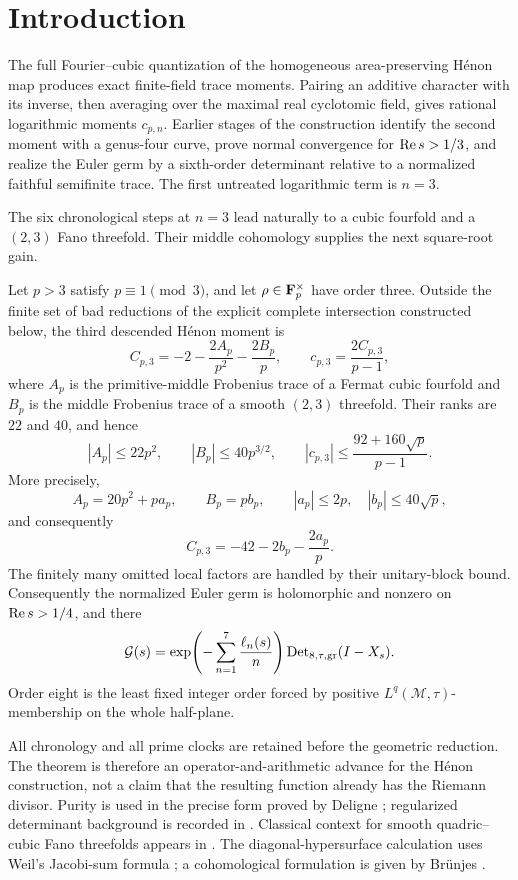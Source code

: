 \section{Introduction}

The full Fourier--cubic quantization of the homogeneous area-preserving
H\'enon map produces exact finite-field trace moments.  Pairing an additive
character with its inverse, then averaging over the maximal real cyclotomic
field, gives rational logarithmic moments \(c_{p,n}\).  Earlier stages of the
construction identify the second moment with a genus-four curve, prove
normal convergence for \(\operatorname{Re} s>1/3\), and realize the Euler germ by a
sixth-order determinant relative to a normalized faithful semifinite trace.
The first untreated logarithmic term is \(n=3\).

The six chronological steps at \(n=3\) lead naturally to a cubic fourfold
and a \((2,3)\) Fano threefold.  Their middle cohomology supplies the next
square-root gain.

\begin{theorem}\label{thm:main}
Let \(p>3\) satisfy \(p\equiv1\pmod3\), and let \(\rho\in\mathbf F_p^\times\) have
order three.  Outside the finite set of bad reductions of the explicit
complete intersection constructed below, the third descended H\'enon moment
is
\[
 C_{p,3}=-2-\frac{2A_p}{p^2}-\frac{2B_p}{p},
 \qquad
 c_{p,3}=\frac{2C_{p,3}}{p-1},
\]
where \(A_p\) is the primitive-middle Frobenius trace of a Fermat cubic
fourfold and \(B_p\) is the middle Frobenius trace of a smooth \((2,3)\)
threefold.  Their ranks are \(22\) and \(40\), and hence
\[
 |A_p|\le22p^2,
 \qquad |B_p|\le40p^{3/2},
 \qquad
 |c_{p,3}|\le\frac{92+160\sqrt p}{p-1}.
\]
More precisely,
\[
 A_p=20p^2+pa_p,\qquad B_p=pb_p,
 \qquad |a_p|\le2p,\quad |b_p|\le40\sqrt p,
\]
and consequently
\[
 C_{p,3}=-42-2b_p-\frac{2a_p}{p}.
\]
The finitely many omitted local factors are handled by their unitary-block
bound.  Consequently the normalized Euler germ is holomorphic and nonzero
on \(\operatorname{Re} s>1/4\), and there
\[
 \mathcal G(s)=
 \exp\!\left(-\sum_{n=1}^{7}\frac{\ell_n(s)}n\right)
 \operatorname{Det}_{8,\tau,\mathrm{gr}}(I-X_s).
\]
Order eight is the least fixed integer order forced by positive
\(L^q(\mathcal M,\tau)\)-membership on the whole half-plane.
\end{theorem}

All chronology and all prime clocks are retained before the geometric
reduction.  The theorem is therefore an operator-and-arithmetic advance for
the H\'enon construction, not a claim that the resulting function already
has the Riemann divisor.  Purity is used in the precise form proved by
Deligne \cite[Th\'eor\`eme~1.6]{Deligne1974}; regularized determinant
background is recorded in \cite[Chapter~9]{Simon2005}.  Classical context
for smooth quadric--cubic Fano threefolds appears in
\cite{BlochMurre1979}.  The diagonal-hypersurface calculation uses Weil's
Jacobi-sum formula \cite{Weil1949}; a cohomological formulation is given by
Br\"unjes \cite[Definition~4.4, Proposition~4.5, Theorem~4.6]{Brunjes2003}.
